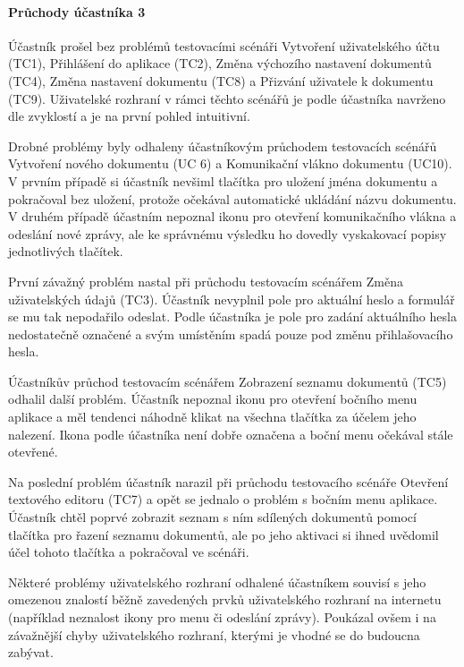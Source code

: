 \paragraph{Průchody účastníka 3}

Účastník prošel bez problémů testovacími scénáři Vytvoření uživatelského účtu (TC1), Přihlášení do aplikace (TC2), Změna výchozího nastavení dokumentů (TC4), Změna nastavení dokumentu (TC8) a Přizvání uživatele k dokumentu (TC9).
Uživatelské rozhraní v rámci těchto scénářů je podle účastníka navrženo dle zvyklostí a je na první pohled intuitivní.

Drobné problémy byly odhaleny účastníkovým průchodem testovacích scénářů Vytvoření nového dokumentu (UC 6) a Komunikační vlákno dokumentu (UC10).
V prvním případě si účastník nevšiml tlačítka pro uložení jména dokumentu a pokračoval bez uložení, protože očekával automatické ukládání názvu dokumentu.
V druhém případě účastním nepoznal ikonu pro otevření komunikačního vlákna a odeslání nové zprávy, ale ke správnému výsledku ho dovedly vyskakovací popisy jednotlivých tlačítek.

První závažný problém nastal při průchodu testovacím scénářem Změna uživatelských údajů (TC3).
Účastník nevyplnil pole pro aktuální heslo a formulář se mu tak nepodařilo odeslat.
Podle účastníka je pole pro zadání aktuálního hesla nedostatečně označené a svým umístěním spadá pouze pod změnu přihlašovacího hesla.

Účastníkův průchod testovacím scénářem Zobrazení seznamu dokumentů (TC5) odhalil další problém.
Účastník nepoznal ikonu pro otevření bočního menu aplikace a měl tendenci náhodně klikat na všechna tlačítka za účelem jeho nalezení.
Ikona podle účastníka není dobře označena a boční menu očekával stále otevřené.

Na poslední problém účastník narazil při průchodu testovacího scénáře Otevření textového editoru (TC7) a opět se jednalo o problém s bočním menu aplikace.
Účastník chtěl poprvé zobrazit seznam s ním sdílených dokumentů pomocí tlačítka pro řazení seznamu dokumentů, ale po jeho aktivaci si ihned uvědomil účel tohoto tlačítka a pokračoval ve scénáři.

Některé problémy uživatelského rozhraní odhalené účastníkem souvisí s jeho omezenou znalostí běžně zavedených prvků uživatelského rozhraní na internetu (například neznalost ikony pro menu či odeslání zprávy).
Poukázal ovšem i na závažnější chyby uživatelského rozhraní, kterými je vhodné se do budoucna zabývat.

